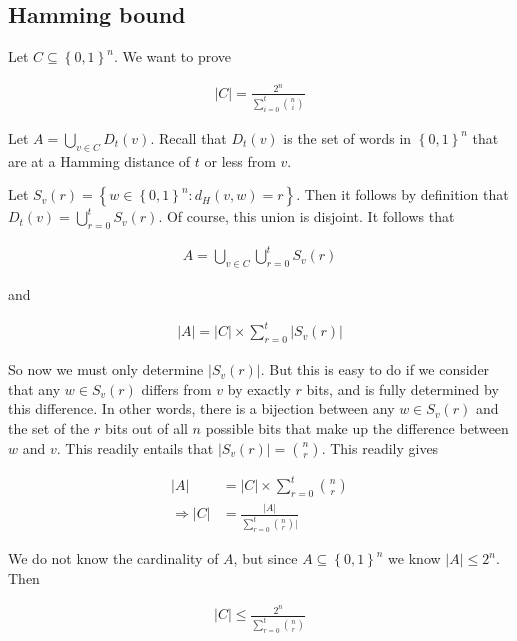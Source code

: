 \subsection{Hamming bound}

Let $C \subseteq \left\{ 0, 1 \right\}^{n} $. We want to prove 

\begin{align*}
    |C| = \frac{2^n}{\sum_{i=0}^{t} \binom{n}{i}}
\end{align*}

Let $A = \bigcup_{v \in C} D_t(v)$. Recall that $D_t(v)$ is the set of words in 
$\left\{ 0, 1 \right\}^n$ that are at a Hamming distance of $t$ or less from $v$.

Let $S_v(r) = \left\{ w \in \left\{ 0, 1 \right\}^n : d_H(v, w) = r  \right\}
$. Then it follows by definition that $D_t(v) = \bigcup_{r=0}^{t} S_v(r)$. Of course,
this union is disjoint. It follows that 

\begin{align*}
    A = \bigcup_{v \in C} \bigcup_{r = 0}^{t} S_v(r)
\end{align*}

and 

\begin{align*}
    |A| = |C| \times \sum_{r=0}^{t} |S_v(r)|
\end{align*}

So now we must only determine $|S_v(r)|$. But this is easy to do if we consider
that any $w \in S_v(r)$ differs from $v$ by exactly $r$ bits, and is fully
determined by this difference. In other words, there is a bijection between any
$w \in S_v(r)$ and the set of the $r$ bits out of all $n$ possible bits that
make up the difference between $w$ and $v$. This readily entails that $|S_v(r)|
= \binom{n}{r}$. This readily gives 

\begin{align*}
    |A| &= |C| \times \sum_{r=0}^{t} \binom{n}{r} \\ 
    \Rightarrow |C| &= \frac{|A|}{\sum_{r=0}^{t} \binom{n}{r} |}
\end{align*}

We do not know the cardinality of $A$, but since $A \subseteq \left\{ 0, 1 \right\}^n $
we know $|A| \leq 2^n$. Then

\begin{align*}
    |C| \leq \frac{2^n}{\sum_{r=0}^{t} \binom{n}{r}}
\end{align*}


\pagebreak


